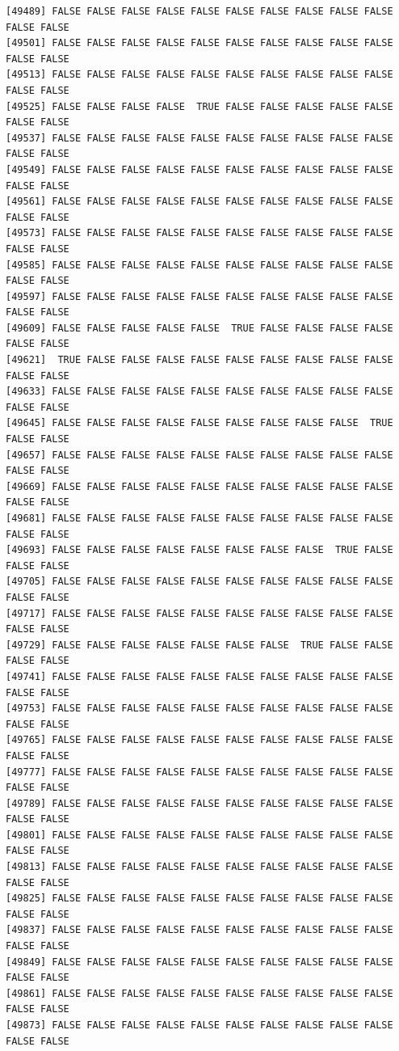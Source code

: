 \documentclass[
  a4paper,
  DIV=11,
  numbers=noendperiod]{scrartcl}
\begin{document}
\begin{verbatim}
[49489] FALSE FALSE FALSE FALSE FALSE FALSE FALSE FALSE FALSE FALSE FALSE FALSE
[49501] FALSE FALSE FALSE FALSE FALSE FALSE FALSE FALSE FALSE FALSE FALSE FALSE
[49513] FALSE FALSE FALSE FALSE FALSE FALSE FALSE FALSE FALSE FALSE FALSE FALSE
[49525] FALSE FALSE FALSE FALSE  TRUE FALSE FALSE FALSE FALSE FALSE FALSE FALSE
[49537] FALSE FALSE FALSE FALSE FALSE FALSE FALSE FALSE FALSE FALSE FALSE FALSE
[49549] FALSE FALSE FALSE FALSE FALSE FALSE FALSE FALSE FALSE FALSE FALSE FALSE
[49561] FALSE FALSE FALSE FALSE FALSE FALSE FALSE FALSE FALSE FALSE FALSE FALSE
[49573] FALSE FALSE FALSE FALSE FALSE FALSE FALSE FALSE FALSE FALSE FALSE FALSE
[49585] FALSE FALSE FALSE FALSE FALSE FALSE FALSE FALSE FALSE FALSE FALSE FALSE
[49597] FALSE FALSE FALSE FALSE FALSE FALSE FALSE FALSE FALSE FALSE FALSE FALSE
[49609] FALSE FALSE FALSE FALSE FALSE  TRUE FALSE FALSE FALSE FALSE FALSE FALSE
[49621]  TRUE FALSE FALSE FALSE FALSE FALSE FALSE FALSE FALSE FALSE FALSE FALSE
[49633] FALSE FALSE FALSE FALSE FALSE FALSE FALSE FALSE FALSE FALSE FALSE FALSE
[49645] FALSE FALSE FALSE FALSE FALSE FALSE FALSE FALSE FALSE  TRUE FALSE FALSE
[49657] FALSE FALSE FALSE FALSE FALSE FALSE FALSE FALSE FALSE FALSE FALSE FALSE
[49669] FALSE FALSE FALSE FALSE FALSE FALSE FALSE FALSE FALSE FALSE FALSE FALSE
[49681] FALSE FALSE FALSE FALSE FALSE FALSE FALSE FALSE FALSE FALSE FALSE FALSE
[49693] FALSE FALSE FALSE FALSE FALSE FALSE FALSE FALSE  TRUE FALSE FALSE FALSE
[49705] FALSE FALSE FALSE FALSE FALSE FALSE FALSE FALSE FALSE FALSE FALSE FALSE
[49717] FALSE FALSE FALSE FALSE FALSE FALSE FALSE FALSE FALSE FALSE FALSE FALSE
[49729] FALSE FALSE FALSE FALSE FALSE FALSE FALSE  TRUE FALSE FALSE FALSE FALSE
[49741] FALSE FALSE FALSE FALSE FALSE FALSE FALSE FALSE FALSE FALSE FALSE FALSE
[49753] FALSE FALSE FALSE FALSE FALSE FALSE FALSE FALSE FALSE FALSE FALSE FALSE
[49765] FALSE FALSE FALSE FALSE FALSE FALSE FALSE FALSE FALSE FALSE FALSE FALSE
[49777] FALSE FALSE FALSE FALSE FALSE FALSE FALSE FALSE FALSE FALSE FALSE FALSE
[49789] FALSE FALSE FALSE FALSE FALSE FALSE FALSE FALSE FALSE FALSE FALSE FALSE
[49801] FALSE FALSE FALSE FALSE FALSE FALSE FALSE FALSE FALSE FALSE FALSE FALSE
[49813] FALSE FALSE FALSE FALSE FALSE FALSE FALSE FALSE FALSE FALSE FALSE FALSE
[49825] FALSE FALSE FALSE FALSE FALSE FALSE FALSE FALSE FALSE FALSE FALSE FALSE
[49837] FALSE FALSE FALSE FALSE FALSE FALSE FALSE FALSE FALSE FALSE FALSE FALSE
[49849] FALSE FALSE FALSE FALSE FALSE FALSE FALSE FALSE FALSE FALSE FALSE FALSE
[49861] FALSE FALSE FALSE FALSE FALSE FALSE FALSE FALSE FALSE FALSE FALSE FALSE
[49873] FALSE FALSE FALSE FALSE FALSE FALSE FALSE FALSE FALSE FALSE FALSE FALSE

\end{verbatim}
\end{document}
